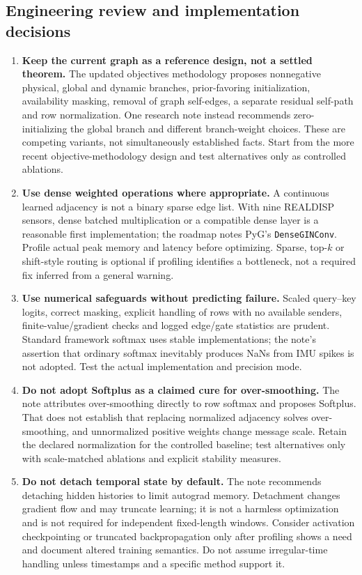 \documentclass[10pt,a4paper]{article}
\begin{document}
\subsection{Engineering review and implementation decisions}
\begin{enumerate}
\item \textbf{Keep the current graph as a reference design, not a settled theorem.} The updated objectives methodology proposes nonnegative physical, global and dynamic branches, prior-favoring initialization, availability masking, removal of graph self-edges, a separate residual self-path and row normalization. One research note instead recommends zero-initializing the global branch and different branch-weight choices. These are competing variants, not simultaneously established facts. Start from the more recent objective-methodology design and test alternatives only as controlled ablations.
\item \textbf{Use dense weighted operations where appropriate.} A continuous learned adjacency is not a binary sparse edge list. With nine REALDISP sensors, dense batched multiplication or a compatible dense layer is a reasonable first implementation; the roadmap notes PyG's \texttt{DenseGINConv}. Profile actual peak memory and latency before optimizing. Sparse, top-$k$ or shift-style routing is optional if profiling identifies a bottleneck, not a required fix inferred from a general warning.
\item \textbf{Use numerical safeguards without predicting failure.} Scaled query--key logits, correct masking, explicit handling of rows with no available senders, finite-value/gradient checks and logged edge/gate statistics are prudent. Standard framework softmax uses stable implementations; the note's assertion that ordinary softmax inevitably produces NaNs from IMU spikes is not adopted. Test the actual implementation and precision mode.
\item \textbf{Do not adopt Softplus as a claimed cure for over-smoothing.} The note attributes over-smoothing directly to row softmax and proposes Softplus. That does not establish that replacing normalized adjacency solves over-smoothing, and unnormalized positive weights change message scale. Retain the declared normalization for the controlled baseline; test alternatives only with scale-matched ablations and explicit stability measures.
\item \textbf{Do not detach temporal state by default.} The note recommends detaching hidden histories to limit autograd memory. Detachment changes gradient flow and may truncate learning; it is not a harmless optimization and is not required for independent fixed-length windows. Consider activation checkpointing or truncated backpropagation only after profiling shows a need and document altered training semantics. Do not assume irregular-time handling unless timestamps and a specific method support it.

\end{enumerate}
\end{document}
